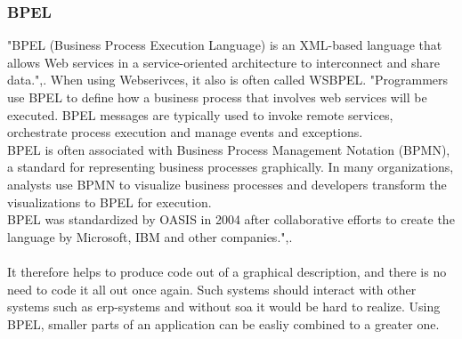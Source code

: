 \documentclass[12pt]{article}
\begin{document}
\subsubsection{BPEL}
\label{sec:bpel}
"BPEL (Business Process Execution Language) is an XML-based language that allows Web services in a service-oriented architecture to interconnect and share data.",\cite{bpelsearchsoa}. When using Webserivces, it also is often called WSBPEL. "Programmers use BPEL to define how a business process that involves web services will be executed. BPEL messages are typically used to invoke remote services, orchestrate process execution and manage events and exceptions.\\
BPEL is often associated with Business Process Management Notation (BPMN), a standard for representing business processes graphically. In many organizations, analysts use BPMN to visualize business processes and developers transform the visualizations to BPEL for execution.\\
BPEL was standardized by OASIS in 2004 after collaborative efforts to create the language by Microsoft, IBM and other companies.",\cite{bpelsearchsoa}.\\
\\
It therefore helps to produce code out of a graphical description, and there is no need to code it all out once again. Such systems should interact with other systems such as \gls{erp}-systems and without \gls{soa} it would be hard to realize. Using BPEL, smaller parts of an application can be easliy combined to a greater one. \cite[page 18]{soagoesreal}
\end{document}
